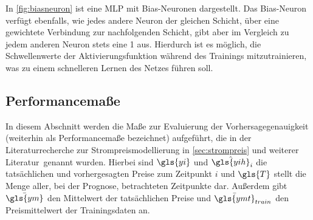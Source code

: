 In \autoref{fig:biasneuron} ist eine MLP mit Bias-Neuronen dargestellt. Das Bias-Neuron verfügt ebenfalls, wie jedes andere Neuron der gleichen Schicht, über eine gewichtete Verbindung zur nachfolgenden Schicht, gibt aber im Vergleich zu jedem anderen Neuron stets eine 1 aus. Hierdurch ist es möglich, die Schwellenwerte der Aktivierungsfunktion während des Trainings mitzutrainieren, was zu einem schnelleren Lernen des Netzes führen soll.\,



\newpage
\subsection{Performancemaße}\label{sec:perfmas}
In diesem Abschnitt werden die Maße zur Evaluierung der Vorhersagegenauigkeit (weiterhin als Performancemaße bezeichnet) aufgeführt, die in der Literaturrecherche zur Strompreismodellierung in \autoref{sec:strompreis} und weiterer Literatur\, genannt wurden. Hierbei sind $\gls{yi}$ und $\hat{\gls{yih}}_i$ die tatsächlichen und vorhergesagten Preise zum Zeitpunkt $i$ und $\gls{T}$ stellt die Menge aller, bei der Prognose, betrachteten Zeitpunkte dar. Außerdem gibt $\mean{\gls{ym}}$ den Mittelwert der tatsächlichen Preise und $\mean{\gls{ymt}}_{train}$ den Preismittelwert der Trainingsdaten an.

